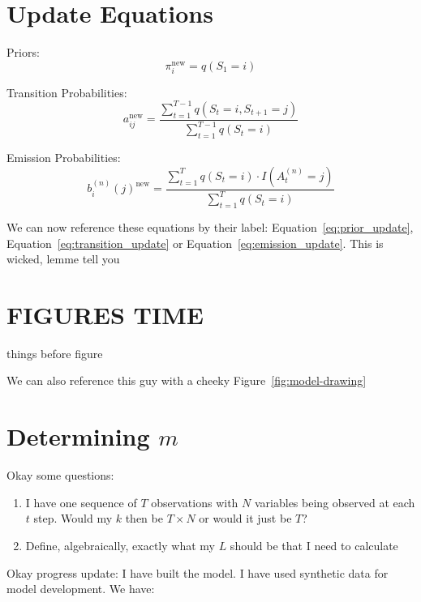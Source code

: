 \newpage

\section{Update Equations}
Priors:
\begin{equation}
\pi_i^{\text{new}} = q(S_1=i)
\label{eq:prior_update}
\end{equation}

Transition Probabilities:
\begin{equation}
a_{ij}^{\text{new}} = \frac{\sum\limits_{t=1}^{T - 1} q(S_t=i,S_{t+1}=j)}{\sum\limits_{t=1}^{T-1} q(S_t=i)}
\label{eq:transition_update}
\end{equation}


Emission Probabilities:
\begin{equation}
b_i^{(n)}(j)^{\text{new}} = \frac{\sum\limits_{t=1}^T q(S_t = i) \cdot I(A_t^{(n)} = j)}{\sum\limits_{t=1}^T q(S_t = i)}
\label{eq:emission_update}
\end{equation}

We can now reference these equations by their label: Equation~\ref{eq:prior_update}, Equation~\ref{eq:transition_update} or Equation~\ref{eq:emission_update}. This is wicked, lemme tell you

\newpage

\section{FIGURES TIME}

things before figure

We can also reference this guy with a cheeky Figure~\ref{fig:model-drawing}


\section{Determining $m$}

Okay some questions:
\begin{enumerate}
    \item I have one sequence of $T$ observations with $N$ variables being observed at each $t$ step. Would my $k$ then be $T \times N$ or would it just be $T$?
    \item Define, algebraically, exactly what my $L$ should be that I need to calculate
\end{enumerate}

Okay progress update:
I have built the model. I have used synthetic data for model development. We have:


